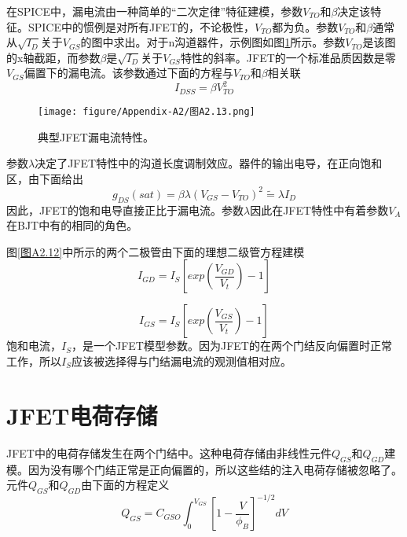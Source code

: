 在SPICE中，漏电流由一种简单的“二次定律”特征建模，参数$V_{TO}$和$\beta$决定该特征。SPICE中的惯例是对所有JFET的，不论极性，$V_{TO}$都为负。参数$V_{TO}$和$\beta$通常从$\sqrt{I_D}$关于$V_{GS}$的图中求出。对于n沟道器件，示例图如图\ref{图A2.13}所示。参数$V_{TO}$是该图的x轴截距，而参数$\beta$是$\sqrt{I_D}$关于$V_{GS}$特性的斜率。JFET的一个标准品质因数是零$V_{GS}$偏置下的漏电流。该参数通过下面的方程与$V_{TO}$和$\beta$相关联
\begin{equation}
    I_{DSS} = \beta V^2_{TO}
    \label{eq:A2.46}
\end{equation}


\begin{figure}[htbp]
\small
    \centering
    \texttt{[image: figure/Appendix-A2/图A2.13.png]}
    \caption{典型JFET漏电流特性。}
    \label{图A2.13}
\end{figure}

参数$\lambda$决定了JFET特性中的沟道长度调制效应。器件的输出电导，在正向饱和区，由下面给出
\begin{equation}
    g_{DS}(sat) = \beta \lambda(V_{GS} - V_{TO})^2 \widetilde{=} \lambda I_D
    \label{eq:A2.47}
\end{equation}
因此，JFET的饱和电导直接正比于漏电流。参数$\lambda$因此在JFET特性中有着参数$V_A$在BJT中有的相同的角色。

图\ref{图A2.12}中所示的两个二极管由下面的理想二级管方程建模
\begin{equation}
    I_{GD} = I_S[exp(\frac{V_{GD}}{V_t})-1]
    \label{eq:A2.48}
\end{equation}

\begin{equation}
    I_{GS} = I_S[exp(\frac{V_{GS}}{V_t})-1]
    \label{eq:A2.49}
\end{equation}
饱和电流，$I_S$，是一个JFET模型参数。因为JFET的在两个门结反向偏置时正常工作，所以$I_S$应该被选择得与门结漏电流的观测值相对应。

\section{JFET电荷存储}
JFET中的电荷存储发生在两个门结中。这种电荷存储由非线性元件$Q_{GS}$和$Q_{GD}$建模。因为没有哪个门结正常是正向偏置的，所以这些结的注入电荷存储被忽略了。元件$Q_{GS}$和$Q_{GD}$由下面的方程定义
\begin{equation}
    Q_{GS} = C_{GSO}\int^{V_{GS}}_0 [1-\frac{V}{\phi_B}]^{-1/2}dV
    \label{eq:A2.50}
\end{equation}


